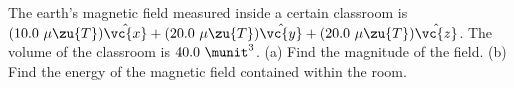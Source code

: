 The earth's magnetic field measured inside a certain classroom
is $(10.0\ \mu\zu{T})\hat{\vc{x}}+(20.0\ \mu\zu{T})\hat{\vc{y}}+(20.0\ \mu\zu{T})\hat{\vc{z}}$.
The volume of the classroom is $40.0\ \munit^3$.
(a) Find the magnitude of the field.\answercheck\hwendpart
(b) Find the energy of the magnetic field contained within the room.
\answercheck\hwendpart

